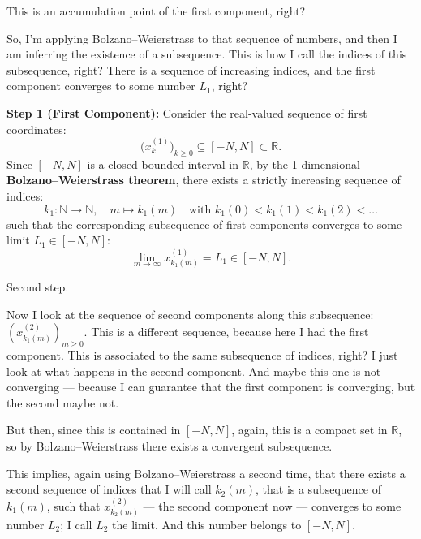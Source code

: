 \begin{proofWrapper}
\begin{speech}[00:56:36 - 00:59:08]
This is an accumulation point of the first component, right?

So, I'm applying Bolzano--Weierstrass to that sequence of numbers, and then I am inferring the existence of a subsequence. This is how I call the indices of this subsequence, right? There is a sequence of increasing indices, and the first component converges to some number $L_1$, right?
\end{speech}

\begin{content}
\textbf{Step 1 (First Component):}
Consider the real-valued sequence of first coordinates:
\[
\bigl( x_k^{(1)} \bigr)_{k \ge 0} \subseteq [-N, N] \subset \mathbb{R}.
\]
Since $[-N, N]$ is a closed bounded interval in $\mathbb{R}$, by the 1-dimensional \textbf{Bolzano--Weierstrass theorem}, there exists a strictly increasing sequence of indices:
\[
k_1 \colon \mathbb{N} \to \mathbb{N}, \quad m \mapsto k_1(m) \quad \text{with } k_1(0) < k_1(1) < k_1(2) < \dots
\]
such that the corresponding subsequence of first components converges to some limit $L_1 \in [-N, N]$:
\begin{equation}\label{eq:first-component-limit}
\lim_{m \to \infty} x_{k_1(m)}^{(1)} = L_1 \in [-N, N].
\end{equation}
\end{content}

\begin{speech}[00:59:08 - 01:01:08]
Second step. 

Now I look at the sequence of second components along this subsequence:  $(x_{k_1(m)}^{(2)})_{m \ge 0}$.  This is a different sequence, because here I had the first component. This is associated to the same subsequence of indices, right? I just look at what happens in the second component. And maybe this one is not converging --- because I can guarantee that the first component is converging, but the second maybe not.

But then, since this is contained in $[-N, N]$,  again, this is a compact set in $\mathbb{R}$, so by Bolzano--Weierstrass there exists a convergent subsequence.

This implies, again using Bolzano--Weierstrass a second time,  that there exists a second sequence of indices that I will call $k_2(m)$,  that is a subsequence of $k_1(m)$,  such that $x_{k_2(m)}^{(2)}$ --- the second component now --- converges to some number $L_2$;  I call $L_2$ the limit.  And this number belongs to $[-N, N]$. 
\end{speech}


\end{proofWrapper}
